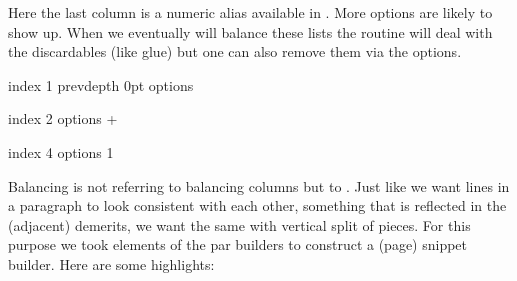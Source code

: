 Here the last column is a numeric alias available in \CONTEXT. More options are
likely to show up. When we eventually will balance these lists the routine will
deal with the discardables (like glue) but one can also remove them via the
options.

\startbuffer
\beginmvl
    index     1
    prevdepth 0pt
    options  \discardtopmvloptioncode
\relax
\scratchdimen\prevdepth
\dontleavehmode
\quad\the\mvlcurrentlyactive\quad\the\scratchdimen
\quad\blackrule[height=\strutht,depth=\strutdp,color=darkred]
\endmvl

\stopbuffer

\typebuffer \start \showmakeup[line] \getbuffer \stop

\startbuffer
\beginmvl
    index  2
    options \numexpr
                \ignoreprevdepthmvloptioncode
              + \discardtopmvloptioncode
            \relax
\relax
\scratchdimen\prevdepth
\dontleavehmode
\quad\the\mvlcurrentlyactive\quad\the\scratchdimen
\quad\blackrule[height=\strutht,depth=\strutdp,color=darkred]
\endmvl

\stopbuffer

\typebuffer \start \showmakeup[line] \getbuffer \stop

\startbuffer
{} %
\scratchdimen\prevdepth
\dontleavehmode
\quad\the\mvlcurrentlyactive\quad\the\scratchdimen
\quad\blackrule[height=\strutht,depth=\strutdp,color=darkred]
\endmvl

\stopbuffer

\typebuffer \start \showmakeup[line] \getbuffer \stop

\startbuffer
\beginmvl index 4 options 1
\scratchdimen\prevdepth
\dontleavehmode
\quad\the\mvlcurrentlyactive\quad\the\scratchdimen
\quad\blackrule[height=\strutht,depth=\strutdp,color=darkred]
\endmvl

\stopbuffer

\typebuffer \start \showmakeup[line] \getbuffer \stop

\stopsectionlevel

\startsectionlevel[title=Balancing]

Balancing is not referring to balancing columns but to . Just like we want lines in a paragraph to look consistent
with each other, something that is reflected in the (adjacent) demerits, we want
the same with vertical split of pieces. For this purpose we took elements of the
par builders to construct a (page) snippet builder. Here are some highlights:

